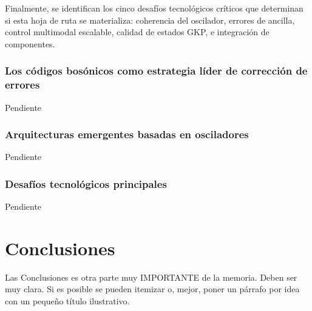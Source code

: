 \documentclass[11pt,a4paper,spanish]{book}
\begin{document}
Finalmente, se identifican los cinco desafíos tecnológicos críticos que determinan si esta hoja de ruta se materializa: coherencia del oscilador, errores de ancilla, control multimodal escalable, calidad de estados GKP, e integración de componentes.

\subsection*{Los códigos bosónicos como estrategia líder de corrección de errores}
Pendiente

\subsection*{Arquitecturas emergentes basadas en osciladores}
Pendiente

\subsection*{Desafíos tecnológicos principales}
Pendiente


\chapter{Conclusiones}

Las Conclusiones es otra parte muy IMPORTANTE de la memoria. Deben ser muy clara. Si es posible se pueden itemizar o, mejor, poner un párrafo por idea con un pequeño título ilustrativo.
\end{document}
